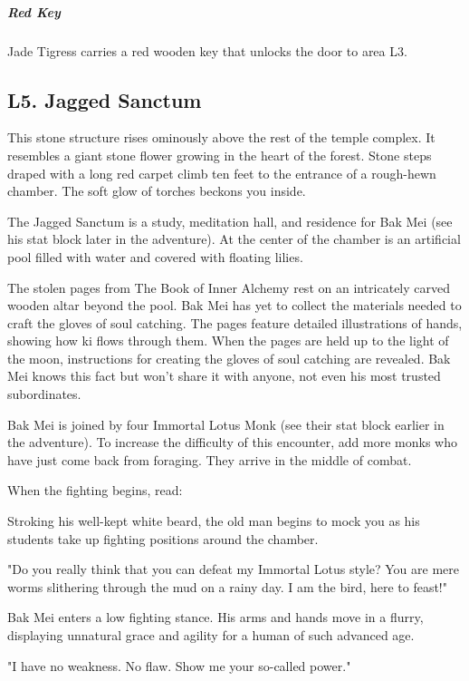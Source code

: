 \documentclass[10pt,a4paper,twoside,bg=print,twocolumn,openany,nodeprecatedcode]{dndbook}
\begin{document}
\subparagraph{Red Key}
Jade Tigress carries a red wooden key that unlocks the door to area L3.

\subsection{L5. Jagged Sanctum}
\begin{DndReadAloud}{}
This stone structure rises ominously above the rest of the temple complex. It resembles a giant stone flower growing in the heart of the forest. Stone steps draped with a long red carpet climb ten feet to the entrance of a rough-hewn chamber. The soft glow of torches beckons you inside.

\end{DndReadAloud}

The Jagged Sanctum is a study, meditation hall, and residence for Bak Mei (see his stat block later in the adventure). At the center of the chamber is an artificial pool filled with water and covered with floating lilies.

The stolen pages from The Book of Inner Alchemy rest on an intricately carved wooden altar beyond the pool. Bak Mei has yet to collect the materials needed to craft the gloves of soul catching. The pages feature detailed illustrations of hands, showing how ki flows through them. When the pages are held up to the light of the moon, instructions for creating the gloves of soul catching are revealed. Bak Mei knows this fact but won't share it with anyone, not even his most trusted subordinates.

Bak Mei is joined by four Immortal Lotus Monk (see their stat block earlier in the adventure). To increase the difficulty of this encounter, add more monks who have just come back from foraging. They arrive in the middle of combat.

When the fighting begins, read:

\begin{DndReadAloud}{}
Stroking his well-kept white beard, the old man begins to mock you as his students take up fighting positions around the chamber.

"Do you really think that you can defeat my Immortal Lotus style? You are mere worms slithering through the mud on a rainy day. I am the bird, here to feast!"

Bak Mei enters a low fighting stance. His arms and hands move in a flurry, displaying unnatural grace and agility for a human of such advanced age.

"I have no weakness. No flaw. Show me your so-called power."

\end{DndReadAloud}
\end{document}

